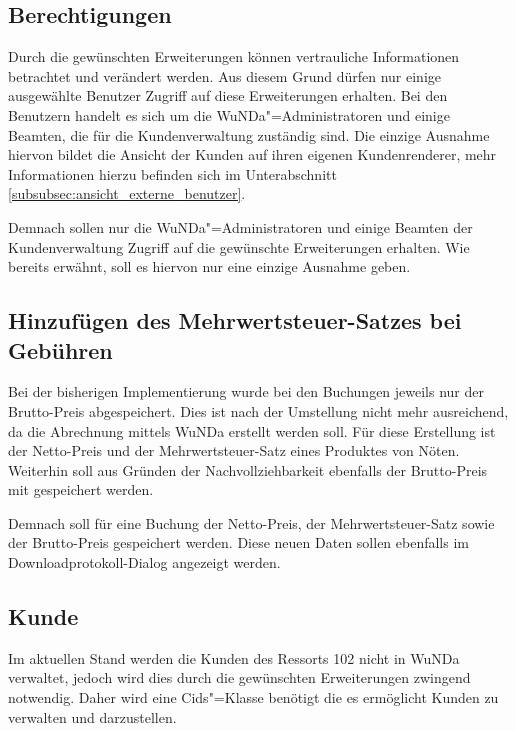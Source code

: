 \subsection{Berechtigungen} \label{subsec:berechtigungen}
Durch die gewünschten Erweiterungen können vertrauliche Informationen betrachtet und verändert werden.
Aus diesem Grund dürfen nur einige ausgewählte Benutzer Zugriff auf diese Erweiterungen erhalten.
Bei den Benutzern handelt es sich um die \ac{WuNDa}"=Administratoren und einige Beamten, die für die Kundenverwaltung zuständig sind.
Die einzige Ausnahme hiervon bildet die Ansicht der Kunden auf ihren eigenen Kundenrenderer, mehr Informationen hierzu befinden sich im Unterabschnitt \autoref{subsubsec:ansicht_externe_benutzer}. 

Demnach sollen nur die \ac{WuNDa}"=Administratoren und einige Beamten der Kundenverwaltung Zugriff auf die gewünschte Erweiterungen erhalten. Wie bereits erwähnt, soll es hiervon nur eine einzige Ausnahme geben.

\subsection{Hinzufügen des Mehrwertsteuer-Satzes bei Gebühren}
Bei der bisherigen Implementierung wurde bei den Buchungen jeweils nur der Brutto-Preis abgespeichert. Dies ist nach der Umstellung nicht mehr ausreichend, da die Abrechnung mittels \ac{WuNDa} erstellt werden soll. Für diese Erstellung ist der Netto-Preis und der Mehrwertsteuer-Satz eines Produktes von Nöten. Weiterhin soll aus Gründen der Nachvollziehbarkeit ebenfalls der Brutto-Preis mit gespeichert werden.

Demnach soll für eine Buchung der Netto-Preis, der Mehrwertsteuer-Satz sowie der Brutto-Preis gespeichert werden. Diese neuen Daten sollen ebenfalls im Downloadprotokoll-Dialog angezeigt werden.
\subsection{Kunde}
Im aktuellen Stand werden die Kunden des Ressorts 102 nicht in \ac{WuNDa} verwaltet, jedoch wird dies durch die gewünschten Erweiterungen zwingend notwendig.
Daher wird eine Cids"=Klasse benötigt die es ermöglicht Kunden zu verwalten und darzustellen. 

